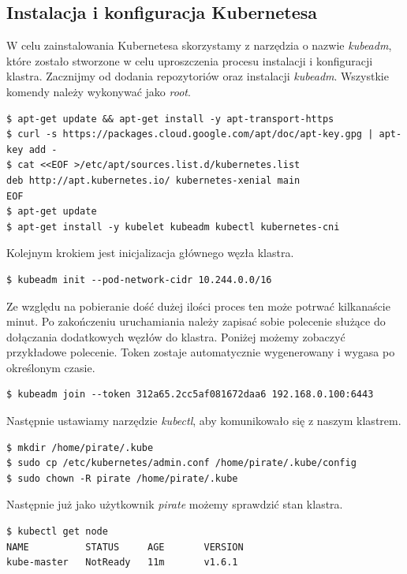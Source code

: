 \documentclass[12pt]{report}
\let\Oldsubsection\subsection
\renewcommand{\subsection}{\FloatBarrier\Oldsubsection}
\begin{document}
{\subsection{Instalacja i konfiguracja Kubernetesa}
W celu zainstalowania Kubernetesa skorzystamy z narzędzia o nazwie \textit{kubeadm}, które zostało stworzone w celu uproszczenia procesu instalacji i konfiguracji klastra. Zacznijmy od dodania repozytoriów oraz instalacji \textit{kubeadm}. Wszystkie komendy należy wykonywać jako \textit{root}. \\

\begin{lstlisting}
$ apt-get update && apt-get install -y apt-transport-https
$ curl -s https://packages.cloud.google.com/apt/doc/apt-key.gpg | apt-key add -
$ cat <<EOF >/etc/apt/sources.list.d/kubernetes.list
deb http://apt.kubernetes.io/ kubernetes-xenial main
EOF
$ apt-get update
$ apt-get install -y kubelet kubeadm kubectl kubernetes-cni
\end{lstlisting}

\noindent Kolejnym krokiem jest inicjalizacja głównego węzła klastra. \\

\begin{lstlisting}
$ kubeadm init --pod-network-cidr 10.244.0.0/16
\end{lstlisting}

Ze względu na pobieranie dość dużej ilości proces ten może potrwać kilkanaście minut. Po zakończeniu uruchamiania należy zapisać sobie polecenie służące do dołączania dodatkowych węzłów do klastra. Poniżej możemy zobaczyć przykładowe polecenie. Token zostaje automatycznie wygenerowany i wygasa po określonym czasie.

\begin{lstlisting}
$ kubeadm join --token 312a65.2cc5af081672daa6 192.168.0.100:6443
\end{lstlisting}

Następnie ustawiamy narzędzie \textit{kubectl}, aby komunikowało się z naszym klastrem.

\begin{lstlisting}
$ mkdir /home/pirate/.kube
$ sudo cp /etc/kubernetes/admin.conf /home/pirate/.kube/config
$ sudo chown -R pirate /home/pirate/.kube
\end{lstlisting}

Następnie już jako użytkownik \textit{pirate} możemy sprawdzić stan klastra.

\begin{lstlisting}[float,floatplacement=H]
$ kubectl get node
NAME          STATUS     AGE       VERSION
kube-master   NotReady   11m       v1.6.1
\end{lstlisting}

}
\end{document}
